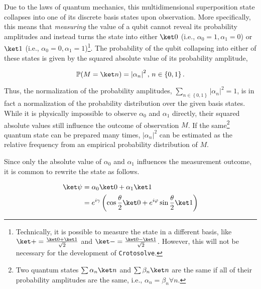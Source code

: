 Due to the laws of quantum mechanics, this multidimensional superposition state
collapses into one of its discrete basis states upon observation.
More specifically, this means that \emph{measuring} the value of a qubit cannot
reveal its probability amplitudes and instead turns the state into either
$\ket 0$ (i.e., $\alpha_0 = 1, \alpha_1 = 0$) or
$\ket 1$ (i.e., $\alpha_0 = 0, \alpha_1 = 1$)\footnote{
    Technically, it is possible to measure the state in a different basis, like
    $\ket + = \frac{\ket 0 + \ket 1}{\sqrt 2}$ and
    $\ket - = \frac{\ket 0 - \ket 1}{\sqrt 2}$.
    However, this will not be necessary for the development of
    \texttt{Crotosolve}.
}.
The probability of the qubit collapsing into either of these states is given by
the squared absolute value of its probability amplitude,

$$\mathbb P(M = \ket n) = \left| \alpha_n \right|^2,\, n \in \left\{0, 1\right\}.$$

Thus, the normalization of the probability amplitudes, 
$\sum_{n \in \left\{0, 1\right\}} \left|\alpha_n\right|^2 = 1$, is in fact a
normalization of the probability distribution over the given basis states.
While it is physically impossible to observe $\alpha_0$ and $\alpha_1$ directly,
their squared absolute values still influence the outcome of observation $M$.
If the same\footnote{
    Two quantum states $\sum \alpha_n \ket n$ and $\sum \beta_n \ket n$ are the
    same if all of their probability amplitudes are the same,
    i.e., $\alpha_n = \beta_n \forall n$.
} quantum state can be prepared many times, $\left|\alpha_n\right|^2$ can be
estimated as the relative frequency from an empirical probability distribution
of $M$.

Since only the absolute value of $\alpha_0$ and $\alpha_1$ influences the
measurement outcome, it is common to rewrite the state as follows.

\begin{equation}
    \begin{split}
        \ket \psi
            &= \alpha_0 \ket 0 + \alpha_1 \ket 1\\
            &= e^{i\gamma} \left(\cos \frac\theta2 \ket 0 + e^{i\varphi} \sin \frac\theta2 \ket 1\right)
    \end{split}
\end{equation}

